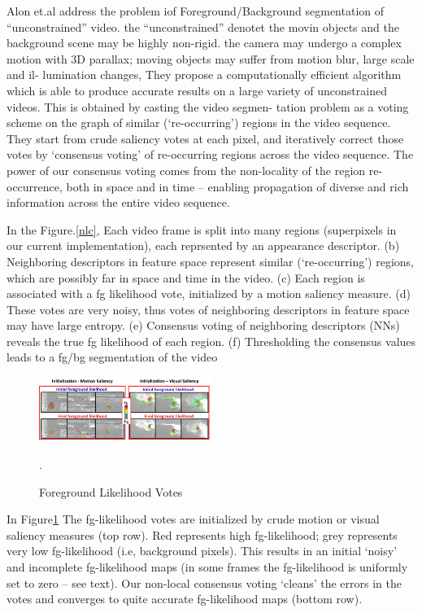 Alon et.al \cite{Faktor2014Video} address the problem iof Foreground/Background segmentation of “unconstrained”
video. the ``unconstrained'' denotet the movin objects and the background scene may be highly non-rigid.  
the camera may undergo a complex motion with 3D parallax; moving objects may suffer from motion blur, large scale and il-
lumination changes, They propose a computationally efficient algorithm which is able to produce accurate results
on a large variety of unconstrained videos. This is obtained by casting the video segmen-
tation problem as a voting scheme on the graph of similar (‘re-occurring’) regions in the
video sequence. They start from crude saliency votes at each pixel, and iteratively correct
those votes by ‘consensus voting’ of re-occurring regions across the video sequence. The
power of our consensus voting comes from the non-locality of the region re-occurrence,
both in space and in time – enabling propagation of diverse and rich information across
the entire video sequence.

In the Figure.\ref{nlc}, Each video frame is split into many regions (superpixels in
our current implementation), each reprsented by an appearance descriptor. (b) Neighboring descriptors
in feature space represent similar (‘re-occurring’) regions, which are possibly far in space and time
in the video. (c) Each region is associated with a fg likelihood vote, initialized by a motion saliency
measure. (d) These votes are very noisy, thus votes of neighboring descriptors in feature space may
have large entropy. (e) Consensus voting of neighboring descriptors (NNs) reveals the true fg likelihood
of each region. (f) Thresholding the consensus values leads to a fg/bg segmentation of the video
\begin{figure}[ht]
    \centering
    \includegraphics[width=0.5\textwidth]{figure/NLC_voting.png}
    \caption{Foreground Likelihood Votes}.
    \label{voting}
\end{figure}

In Figure\ref{voting} The fg-likelihood votes are initialized by crude motion
or visual saliency measures (top row). Red represents high fg-likelihood; grey represents very low
fg-likelihood (i.e, background pixels). This results in an initial ‘noisy’ and incomplete fg-likelihood
maps (in some frames the fg-likelihood is uniformly set to zero – see text). Our non-local consensus
voting ‘cleans’ the errors in the votes and converges to quite accurate fg-likelihood maps (bottom row).

